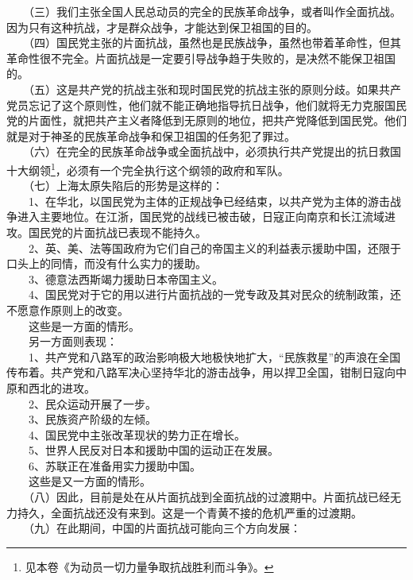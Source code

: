 \documentclass[cn,11pt,chinese]{elegantbook}
\begin{document}
　　（三）我们主张全国人民总动员的完全的民族革命战争，或者叫作全面抗战。因为只有这种抗战，才是群众战争，才能达到保卫祖国的目的。\\
　　（四）国民党主张的片面抗战，虽然也是民族战争，虽然也带着革命性，但其革命性很不完全。片面抗战是一定要引导战争趋于失败的，是决然不能保卫祖国的。\\
　　（五）这是共产党的抗战主张和现时国民党的抗战主张的原则分歧。如果共产党员忘记了这个原则性，他们就不能正确地指导抗日战争，他们就将无力克服国民党的片面性，就把共产主义者降低到无原则的地位，把共产党降低到国民党。他们就是对于神圣的民族革命战争和保卫祖国的任务犯了罪过。\\
　　（六）在完全的民族革命战争或全面抗战中，必须执行共产党提出的抗日救国十大纲领\footnote[4]{ 见本卷《为动员一切力量争取抗战胜利而斗争》。}，必须有一个完全执行这个纲领的政府和军队。\\
　　（七）上海太原失陷后的形势是这样的：\\
　　1、在华北，以国民党为主体的正规战争已经结束，以共产党为主体的游击战争进入主要地位。在江浙，国民党的战线已被击破，日寇正向南京和长江流域进攻。国民党的片面抗战已表现不能持久。\\
　　2、英、美、法等国政府为它们自己的帝国主义的利益表示援助中国，还限于口头上的同情，而没有什么实力的援助。\\
　　3、德意法西斯竭力援助日本帝国主义。\\
　　4、国民党对于它的用以进行片面抗战的一党专政及其对民众的统制政策，还不愿意作原则上的改变。\\
　　这些是一方面的情形。\\
　　另一方面则表现：\\
　　1、共产党和八路军的政治影响极大地极快地扩大，“民族救星”的声浪在全国传布着。共产党和八路军决心坚持华北的游击战争，用以捍卫全国，钳制日寇向中原和西北的进攻。\\
　　2、民众运动开展了一步。\\
　　3、民族资产阶级的左倾。\\
　　4、国民党中主张改革现状的势力正在增长。\\
　　5、世界人民反对日本和援助中国的运动正在发展。\\
　　6、苏联正在准备用实力援助中国。\\
　　这些是又一方面的情形。\\
　　（八）因此，目前是处在从片面抗战到全面抗战的过渡期中。片面抗战已经无力持久，全面抗战还没有来到。这是一个青黄不接的危机严重的过渡期。\\
　　（九）在此期间，中国的片面抗战可能向三个方向发展：\\
\end{document}
